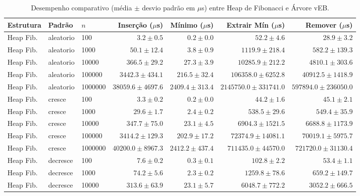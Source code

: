 \begin{table}[htbp]
  \centering
  \caption{Desempenho comparativo (média $\pm$ desvio padrão em $\mu$s) entre Heap de Fibonacci e Árvore vEB.}
  \label{tab:resultados-estudo1}
  \small
  \begin{tabular}{lllrrrr}
    \toprule
    \textbf{Estrutura} & \textbf{Padrão} & \textbf{$n$} & \textbf{Inserção ($\mu$s)} & \textbf{Mínimo ($\mu$s)} & \textbf{Extrair Mín ($\mu$s)} & \textbf{Remover ($\mu$s)} \\
    \midrule
    Heap Fib. & aleatorio & 100 & $3.2 \pm 0.5$ & $0.2 \pm 0.0$ & $52.2 \pm 4.6$ & $28.9 \pm 3.2$ \\
    Heap Fib. & aleatorio & 1000 & $50.1 \pm 12.4$ & $3.8 \pm 0.9$ & $1119.9 \pm 218.4$ & $582.2 \pm 139.3$ \\
    Heap Fib. & aleatorio & 10000 & $366.5 \pm 29.2$ & $27.3 \pm 3.9$ & $10285.9 \pm 212.2$ & $4810.1 \pm 303.6$ \\
    Heap Fib. & aleatorio & 100000 & $3442.3 \pm 434.1$ & $216.5 \pm 32.4$ & $106358.0 \pm 6252.8$ & $40912.5 \pm 1418.9$ \\
    Heap Fib. & aleatorio & 1000000 & $38059.6 \pm 4697.6$ & $2409.4 \pm 313.4$ & $2145750.0 \pm 331741.0$ & $597894.0 \pm 236050.0$ \\
    \midrule
    Heap Fib. & cresce & 100 & $3.3 \pm 0.2$ & $0.2 \pm 0.0$ & $44.2 \pm 1.6$ & $45.1 \pm 2.1$ \\
    Heap Fib. & cresce & 1000 & $29.6 \pm 1.7$ & $2.4 \pm 0.2$ & $538.5 \pm 29.6$ & $549.4 \pm 35.9$ \\
    Heap Fib. & cresce & 10000 & $347.7 \pm 75.0$ & $23.1 \pm 4.5$ & $6904.3 \pm 1521.5$ & $6688.8 \pm 1173.9$ \\
    Heap Fib. & cresce & 100000 & $3414.2 \pm 129.3$ & $202.9 \pm 17.2$ & $72374.9 \pm 14081.1$ & $70019.1 \pm 5975.7$ \\
    Heap Fib. & cresce & 1000000 & $40200.0 \pm 8967.3$ & $2412.2 \pm 437.4$ & $711435.0 \pm 44570.0$ & $721720.0 \pm 31130.4$ \\
    \midrule
    Heap Fib. & decresce & 100 & $7.6 \pm 0.2$ & $0.3 \pm 0.1$ & $102.8 \pm 2.2$ & $53.4 \pm 1.1$ \\
    Heap Fib. & decresce & 1000 & $74.2 \pm 5.6$ & $2.3 \pm 0.2$ & $1259.8 \pm 78.6$ & $659.2 \pm 149.7$ \\
    Heap Fib. & decresce & 10000 & $313.6 \pm 63.9$ & $23.1 \pm 5.7$ & $6048.7 \pm 772.2$ & $3052.2 \pm 666.5$ \\

\end{tabular}
\end{table}
